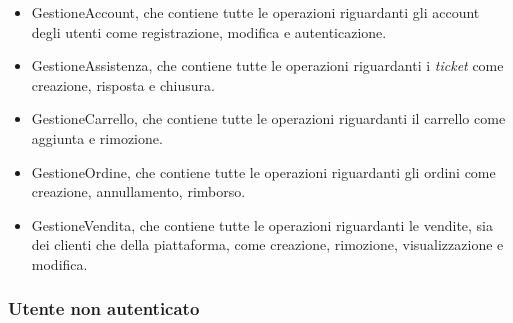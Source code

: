 \documentclass[12pt,a4paper]{article}
\begin{document}
\begin{itemize}
\item GestioneAccount, che contiene tutte le operazioni riguardanti gli account degli utenti come registrazione, modifica e autenticazione.
\item GestioneAssistenza, che contiene tutte le operazioni riguardanti i \emph{ticket} come creazione, risposta e chiusura.
\item GestioneCarrello, che contiene tutte le operazioni riguardanti il carrello come aggiunta e rimozione.
\item GestioneOrdine, che contiene tutte le operazioni riguardanti gli ordini come creazione, annullamento, rimborso.
\item GestioneVendita, che contiene tutte le operazioni riguardanti le vendite, sia dei clienti che della piattaforma, come creazione, rimozione, visualizzazione e modifica.
\end{itemize}

\subsubsection{Utente non autenticato}
\end{document}
